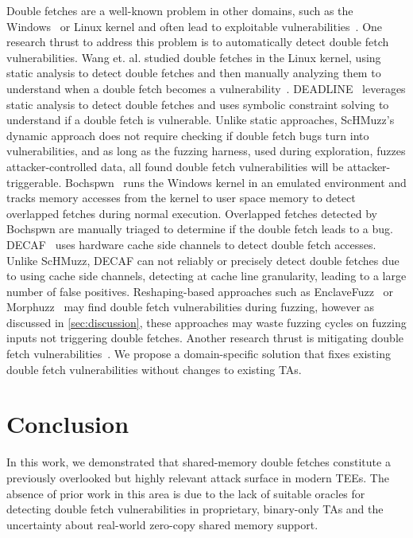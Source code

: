 \documentclass[conference]{IEEEtran}
\newcommand{\sysname}{ScHMuzz\xspace}
\begin{document}
Double fetches are a well-known problem in other domains, such as 
the Windows~\cite{ms2008} or Linux kernel\cite{wang2017double} and often lead 
to exploitable vulnerabilities~\cite{warpattack,bochspwn}.
One research thrust to address this problem is to automatically detect double 
fetch vulnerabilities. Wang et. al. studied double fetches in the Linux kernel, 
using static analysis to detect double fetches and then manually analyzing them 
to understand when a double fetch becomes a vulnerability~\cite{wang2017double}. 
DEADLINE~\cite{deadline} leverages static analysis to detect double fetches and 
uses symbolic constraint solving to understand if a double fetch is vulnerable. 
Unlike static approaches, \sysname's 
dynamic approach does not require checking if double fetch bugs turn into 
vulnerabilities, and as long as the fuzzing harness, used 
during exploration, fuzzes attacker-controlled data, all found double fetch 
vulnerabilities will be attacker-triggerable. Bochspwn~\cite{bochspwn} runs 
the Windows kernel in an emulated environment and tracks memory accesses from the 
kernel to user space memory to detect overlapped fetches during normal execution. 
Overlapped fetches detected by Bochspwn are manually triaged to determine if the double 
fetch leads to a bug. DECAF~\cite{decaf} uses hardware cache side 
channels to detect double fetch accesses. Unlike \sysname, DECAF can not reliably 
or precisely detect double fetches due to using cache side channels, detecting at 
cache line granularity, leading to a large number of false positives. 
Reshaping-based approaches such as EnclaveFuzz~\cite{chen2024enclavefuzz} or 
Morphuzz~\cite{morphuzz} may find double fetch vulnerabilities during fuzzing, however 
as discussed in \autoref{sec:discussion}, these approaches may waste fuzzing cycles on 
fuzzing inputs not triggering double fetches. 
Another research thrust is mitigating double fetch vulnerabilities~\cite{midas,safefetch,decaf,dftinker}.
We propose a domain-specific solution that fixes existing double fetch vulnerabilities 
without changes to existing TAs.

\section{Conclusion}\label{sec:conclusion}

In this work, we demonstrated that shared-memory double fetches constitute a previously overlooked 
but highly relevant attack surface in modern TEEs. The absence of prior work 
in this area is due to the lack of suitable oracles for detecting double fetch 
vulnerabilities in proprietary, binary-only TAs and the uncertainty about real-world 
zero-copy shared memory support.
\end{document}
